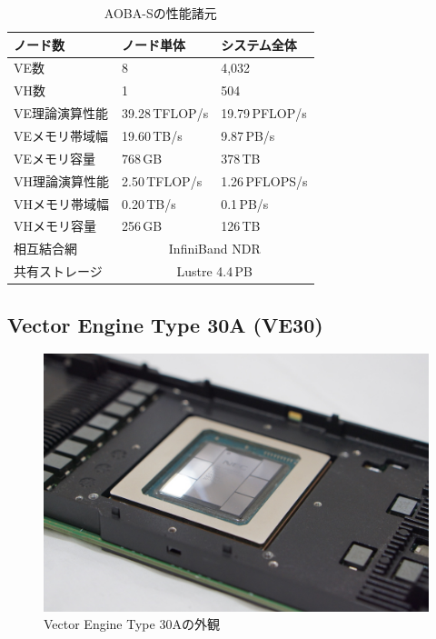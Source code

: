 ﻿\documentclass[submit,techrep,noauthor]{ipsj}
\begin{document}
\begin{table}[tb]
\centering
\caption{AOBA-Sの性能諸元}\label{tbl:aoba-s}
\begin{tabular}{@{}lll@{}}
\toprule
ノード数        & ノード単体     & システム全体           \\ \midrule
VE数            & 8              & 4,032                  \\ \midrule
VH数            & 1              & 504                    \\
VE理論演算性能  & 39.28\,TFLOP/s & 19.79\,PFLOP/s         \\
VEメモリ帯域幅  & 19.60\,TB/s    & 9.87\,PB/s             \\
VEメモリ容量    & 768\,GB        & 378\,TB                \\ \midrule
VH理論演算性能  & 2.50\,TFLOP/s  & 1.26\,PFLOPS/s         \\
VHメモリ帯域幅  & 0.20\,TB/s     & 0.1\,PB/s              \\
VHメモリ容量    & 256\,GB        & 126\,TB                \\ \midrule
相互結合網      & \multicolumn{2}{c}{InfiniBand NDR}      \\
共有ストレージ  & \multicolumn{2}{c}{Lustre 4.4\,PB}      \\ \bottomrule
\end{tabular}
\end{table}

\subsection{Vector Engine Type 30A (VE30)}

\begin{figure}[tb]
  \centering
  \includegraphics[width=.9\columnwidth]{figs/ve30.jpg}
  \caption{Vector Engine Type 30Aの外観}\label{fig:ve-card}
\end{figure}
\end{document}
